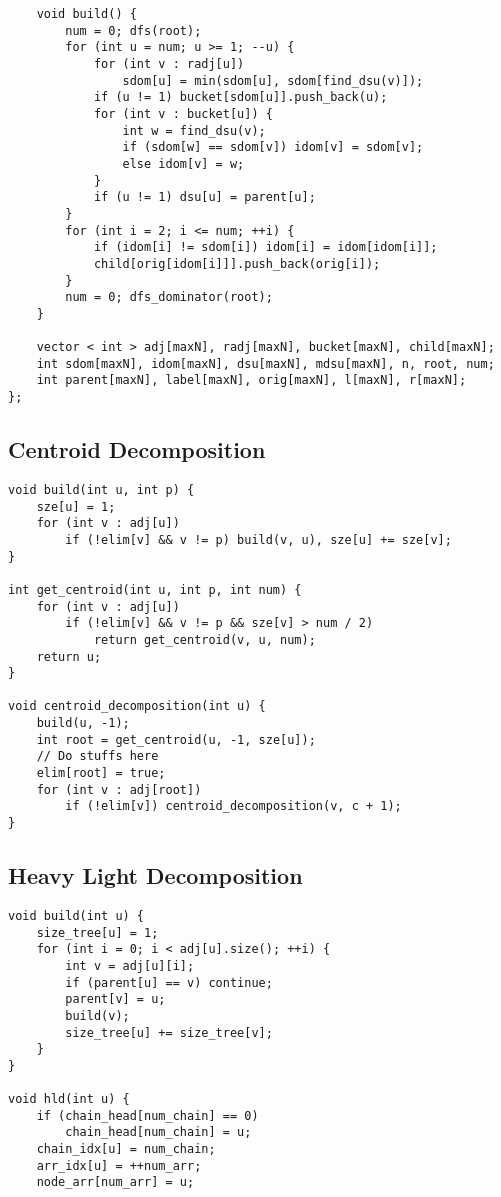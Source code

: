 \documentclass[10pt,landscape]{article}
\begin{document}
\begin{multicols}{2}
\begin{lstlisting}
    void build() {
        num = 0; dfs(root);
        for (int u = num; u >= 1; --u) {
            for (int v : radj[u])
                sdom[u] = min(sdom[u], sdom[find_dsu(v)]);
            if (u != 1) bucket[sdom[u]].push_back(u);
            for (int v : bucket[u]) {
                int w = find_dsu(v);
                if (sdom[w] == sdom[v]) idom[v] = sdom[v];
                else idom[v] = w;
            }
            if (u != 1) dsu[u] = parent[u];
        }
        for (int i = 2; i <= num; ++i) {
            if (idom[i] != sdom[i]) idom[i] = idom[idom[i]];
            child[orig[idom[i]]].push_back(orig[i]);
        }
        num = 0; dfs_dominator(root);
    }
    
    vector < int > adj[maxN], radj[maxN], bucket[maxN], child[maxN];
    int sdom[maxN], idom[maxN], dsu[maxN], mdsu[maxN], n, root, num;
    int parent[maxN], label[maxN], orig[maxN], l[maxN], r[maxN];
};
\end{lstlisting}
\subsection{Centroid Decomposition}
\begin{lstlisting}
void build(int u, int p) {
    sze[u] = 1;
    for (int v : adj[u])
        if (!elim[v] && v != p) build(v, u), sze[u] += sze[v];
}

int get_centroid(int u, int p, int num) {
    for (int v : adj[u])
        if (!elim[v] && v != p && sze[v] > num / 2)
            return get_centroid(v, u, num);
    return u;
}

void centroid_decomposition(int u) {
    build(u, -1);
    int root = get_centroid(u, -1, sze[u]);
    // Do stuffs here
    elim[root] = true;
    for (int v : adj[root])
        if (!elim[v]) centroid_decomposition(v, c + 1);
}
\end{lstlisting}
\subsection{Heavy Light Decomposition}
\begin{lstlisting}
void build(int u) {
    size_tree[u] = 1;
    for (int i = 0; i < adj[u].size(); ++i) {
        int v = adj[u][i];
        if (parent[u] == v) continue;
        parent[v] = u;
        build(v);
        size_tree[u] += size_tree[v];
    }
}

void hld(int u) {
    if (chain_head[num_chain] == 0)
        chain_head[num_chain] = u;
    chain_idx[u] = num_chain;
    arr_idx[u] = ++num_arr;
    node_arr[num_arr] = u;
    

\end{lstlisting}
\end{multicols}
\end{document}
